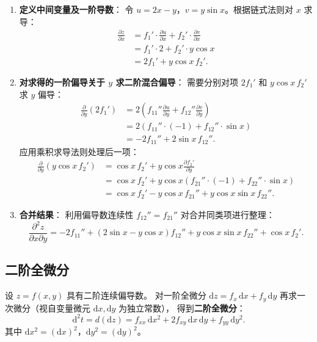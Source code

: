 \documentclass[lang=cn,11pt]{elegantbook}
\begin{document}
\begin{solution}
\begin{enumerate}
  \item \textbf{定义中间变量及一阶导数}：
  令 $u=2x-y$，$v=y\sin x$。根据链式法则对 $x$ 求导：
  \begin{align*}
  \frac{\partial z}{\partial x}
  &=f_1'\cdot\frac{\partial u}{\partial x}+f_2'\cdot\frac{\partial v}{\partial x} \\
  &=f_1'\cdot 2+f_2'\cdot y\cos x \\
  &=\boxed{2f_1'+y\cos x\,f_2'}.
  \end{align*}

  \item \textbf{对求得的一阶偏导关于 $y$ 求二阶混合偏导}：
  需要分别对项 $2f_1'$ 和 $y\cos x\,f_2'$ 求 $y$ 偏导：
  \begin{align*}
  \frac{\partial}{\partial y}(2f_1')
  &=2\!\left(f_{11}''\frac{\partial u}{\partial y}+f_{12}''\frac{\partial v}{\partial y}\right)\\
  &=2\!\left(f_{11}''\cdot(-1)+f_{12}''\cdot\sin x\right)\\
  &=-2f_{11}''+2\sin x\,f_{12}''.
  \end{align*}
  应用乘积求导法则处理后一项：
  \begin{align*}
  \frac{\partial}{\partial y}(y\cos x\,f_2')
  &=\cos x\,f_2'+y\cos x\frac{\partial f_2'}{\partial y}\\
  &=\cos x\,f_2'+y\cos x\!\left(f_{21}''\cdot(-1)+f_{22}''\cdot\sin x\right)\\
  &=\cos x\,f_2'-y\cos x\,f_{21}''+y\cos x\sin x\,f_{22}''.
  \end{align*}

  \item \textbf{合并结果}：
  利用偏导数连续性 $f_{12}''=f_{21}''$ 对合并同类项进行整理：
  \[
  \boxed{\frac{\partial^2 z}{\partial x\partial y}=-2f_{11}''+(2\sin x-y\cos x)f_{12}''+y\cos x\sin x\,f_{22}''+\cos x\,f_2'}.
  \]
\end{enumerate}
\end{solution}


\subsection{二阶全微分}

\begin{definition}[二阶全微分] \label{def:second-total-diff}
设 $z=f(x,y)$ 具有二阶连续偏导数。
对一阶全微分 $\mathrm{d}z=f_x\,\mathrm{d}x+f_y\,\mathrm{d}y$ 再求一次微分（视自变量微元 $\mathrm{d}x,\mathrm{d}y$ 为独立常数），
得到\textbf{二阶全微分}：
\[
\mathrm{d}^2t=d(\mathrm{d}z)=f_{xx}\,\mathrm{d}x^2+2f_{xy}\,\mathrm{d}x\,\mathrm{d}y+f_{yy}\,\mathrm{d}y^2.
\]
其中 $\mathrm{d}x^2=(\mathrm{d}x)^2$，$\mathrm{d}y^2=(\mathrm{d}y)^2$。
\end{definition}
\end{document}
